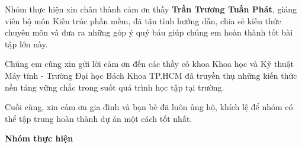 Nhóm thực hiện xin chân thành cảm ơn thầy \textbf{Trần Trương Tuấn Phát}, giảng viên bộ môn Kiến trúc phần mềm, đã tận tình hướng dẫn, chia sẻ kiến thức chuyên môn và đưa ra những góp ý quý báu giúp chúng em hoàn thành tốt bài tập lớn này.

Chúng em cũng xin gửi lời cảm ơn đến các thầy cô khoa Khoa học và Kỹ thuật Máy tính - Trường Đại học Bách Khoa TP.HCM đã truyền thụ những kiến thức nền tảng vững chắc trong suốt quá trình học tập tại trường.

Cuối cùng, xin cảm ơn gia đình và bạn bè đã luôn ủng hộ, khích lệ để nhóm có thể tập trung hoàn thành dự án một cách tốt nhất.

\begin{flushright}
\textbf{Nhóm thực hiện}\\
\end{flushright}
